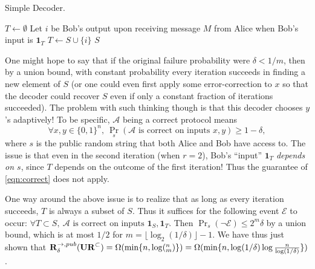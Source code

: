 \begin{algorithm}[H] 
  \caption{Simple Decoder.} \label{algo:wrong}
  \begin{algorithmic}[1]
    \State $T\leftarrow \emptyset$
      \State Let $i$ be Bob's output upon receiving message $M$ from Alice when Bob's input is $\mathbf{1}_T$
      \State $T \leftarrow S \cup\{i\}$
    \EndFor
    \State \Return $S$
    \EndProcedure
  \end{algorithmic}
\end{algorithm}

One might hope to say that if the original failure probability were $\delta < 1/m$, then by a union bound, with constant probability every iteration succeeds in finding a new element of $S$ (or one could even first apply some error-correction to $x$ so that the decoder could recover $S$ even if only a constant fraction of iterations succeeded). The problem with such thinking though is that this decoder chooses $y$'s adaptively! To be specific, $\mathcal{A}$ being a correct protocol means
\begin{equation}
\forall x,y\in\{0,1\}^n,\ \Pr_s(\mathcal{A}\text{ is correct on inputs }x,y) \ge 1-\delta , \label{eqn:correct}
\end{equation}
where $s$ is the public random string that both Alice and Bob have access to. The issue is that even in the second iteration (when $r=2$), Bob's ``input'' $\mathbf{1}_T$ {\em depends on $s$}, since $T$ depends on the outcome of the first iteration! Thus the guarantee of \eqref{eqn:correct} does not apply.

One way around the above issue is to realize that as long as every iteration succeeds, $T$ is always a subset of $S$. Thus it suffices for the following event $\mathcal{E}$ to occur: $\forall T\subset S,\ \mathcal{A}\text{ is correct on inputs }\mathbf{1}_S, \mathbf{1}_T$. Then $\Pr_s(\neg \mathcal{E}) \le 2^m\delta$ by a union bound, which is at most $1/2$ for $m = \lfloor \log_2(1/\delta)\rfloor - 1$. We have thus just shown that $\mathbf{R}^{\rightarrow,pub}_\delta(\mathbf{UR}^\subset) = \Omega(\min\{n, \log(^n_m)\}) = \Omega(\min\{n, \log(1/\delta)\log \frac n{\log(1/\delta)}\})$.

